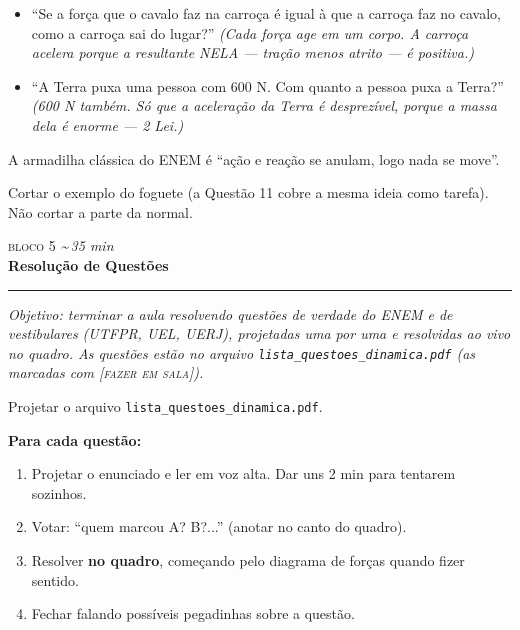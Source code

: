 \documentclass[11pt,a4paper]{article}
\newcommand{\bloco}[3]{%
  \needspace{7\baselineskip}
  \vspace{1.8em}
  {\scshape\color{vinho}bloco #1}\hfill
    {\small\itshape\color{grafite}\textasciitilde\,#3 min}\\[0.1em]
  {\Large\bfseries #2}\\[-0.55em]
  {\color{black!30}\rule{\linewidth}{0.5pt}}
  \par\nobreak\smallskip
}
\newcommand{\objetivo}[1]{{\itshape\color{grafite}Objetivo: #1}\par\smallskip}
\begin{document}
\begin{perguntas}
\begin{itemize}[nosep]
  \item ``Se a for\c{c}a que o cavalo faz na carro\c{c}a \'e igual \`a
        que a carro\c{c}a faz no cavalo, como a carro\c{c}a sai do
        lugar?''
        \textit{(Cada for\c{c}a age em um corpo. A carro\c{c}a acelera
        porque a resultante NELA --- tra\c{c}\~ao menos atrito --- \'e
        positiva.)}
  \item ``A Terra puxa uma pessoa com 600 N. Com quanto a pessoa puxa a
        Terra?''
        \textit{(600 N tamb\'em. S\'o que a acelera\c{c}\~ao da Terra
        \'e desprez\'ivel, porque a massa dela \'e enorme ---
        2\textordfeminine{} Lei.)}
\end{itemize}
\end{perguntas}

\begin{obs}
A armadilha cl\'assica do ENEM \'e ``a\c{c}\~ao e rea\c{c}\~ao se
anulam, logo nada se move''.
\end{obs}

\begin{corte}
Cortar o exemplo do foguete (a Quest\~ao 11 cobre a mesma ideia como
tarefa). N\~ao cortar a parte da normal.
\end{corte}

\bloco{5}{Resolução de Quest\~oes}{35}

\objetivo{terminar a aula resolvendo quest\~oes de verdade do ENEM e de
vestibulares (UTFPR, UEL, UERJ), projetadas uma por uma e resolvidas ao vivo no quadro.
As quest\~oes est\~ao no arquivo
\texttt{lista\_questoes\_dinamica.pdf} (as marcadas com
{\scshape\color{vinho}[fazer em sala]}).}

\begin{projetor}
Projetar o arquivo
\texttt{lista\_questoes\_dinamica.pdf}.

\smallskip
\textbf{Para cada quest\~ao:}
\begin{enumerate}[nosep]
  \item Projetar o enunciado e ler em voz alta. Dar uns 2 min para
        tentarem sozinhos.
  \item Votar: ``quem marcou A? B?...'' (anotar no canto do quadro).
  \item Resolver \textbf{no quadro}, come\c{c}ando pelo diagrama de
        for\c{c}as quando fizer sentido.
  \item Fechar falando possíveis pegadinhas sobre a questão.
\end{enumerate}
\end{projetor}
\end{document}
